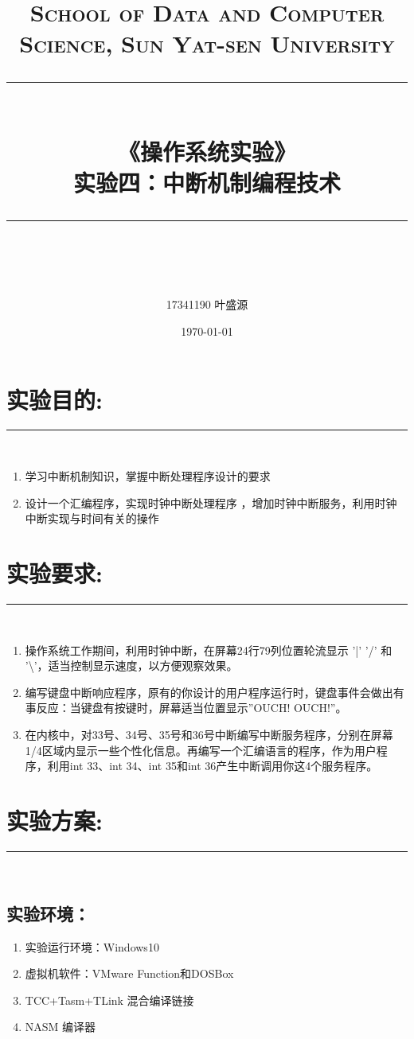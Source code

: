 \documentclass[UTF8]{article}
\title{	
\normalfont \normalsize
\textsc{School of Data and Computer Science, Sun Yat-sen University} \\ [25pt] %
\rule{\textwidth}{0.5pt} \\[0.4cm] %
{\LARGE\heiti\bfseries  《操作系统实验》}\\[0.5cm] %
{\huge\bfseries\heiti 实验四：中断机制编程技术} \\
\rule{\textwidth}{2pt} \\[0.5cm] %
\author{\Large17341190 叶盛源}
\date{\normalsize\today}
}
\begin{document}
\maketitle
\tableofcontents
\newpage
	

\section{实验目的:}
\noindent\rule[0.2\baselineskip]{\textwidth}{0.5pt}\\[-23pt]
\begin{enumerate}[1)]
	\heiti
	\item 学习中断机制知识，掌握中断处理程序设计的要求

	\item 设计一个汇编程序，实现时钟中断处理程序
	，增加时钟中断服务，利用时钟中断实现与时间有关的操作
\end{enumerate}

\section{实验要求:}
\noindent\rule[0.2\baselineskip]{\textwidth}{0.5pt}\\[-23pt]
\begin{enumerate}[1)]
	\setlength{\itemsep}{0.2ex}
	\heiti
	\item 操作系统工作期间，利用时钟中断，在屏幕24行79列位置轮流显示 '|' '/' 和 '\textbackslash'，适当控制显示速度，以方便观察效果。
	\item 编写键盘中断响应程序，原有的你设计的用户程序运行时，键盘事件会做出有事反应：当键盘有按键时，屏幕适当位置显示”OUCH! OUCH!”。
	\item 在内核中，对33号、34号、35号和36号中断编写中断服务程序，分别在屏幕1/4区域内显示一些个性化信息。再编写一个汇编语言的程序，作为用户程序，利用int 33、int 34、int 35和int 36产生中断调用你这4个服务程序。
\end{enumerate}


\section{实验方案:}
\noindent\rule[0.2\baselineskip]{\textwidth}{0.5pt}\\[-32pt]

\subsection{实验环境：}
\begin{enumerate}[1)]%
\heiti
\setlength{\itemsep}{0em}
	\item 实验运行环境：Windows10
	\item 虚拟机软件：VMware Function和DOSBox
	\item TCC+Tasm+TLink 混合编译链接
	\item NASM 编译器
	\end{enumerate}
\end{document}
